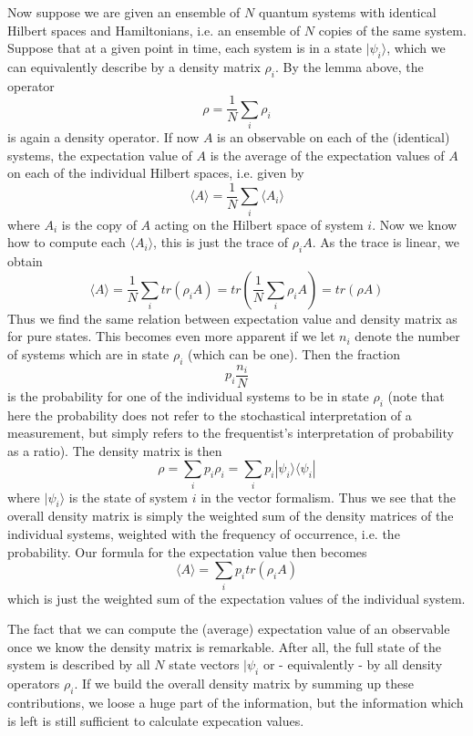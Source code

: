 \documentclass[a4paper, draft]{article}
\theoremstyle{own}
\theoremstyle{remark}
\begin{document}
Now suppose we are given an ensemble of $N$ quantum systems with identical Hilbert spaces and Hamiltonians, i.e. an ensemble of $N$ copies of the same system. Suppose that at a given point in time, each system is in a state $|\psi_i \rangle$, which we can equivalently describe by a density matrix $\rho_i$. By the lemma above, the operator
$$
\rho = \frac{1}{N} \sum_i \rho_i
$$
is again a density operator. If now $A$ is an observable on each of the (identical) systems, the expectation value of $A$ is the average of the expectation values of $A$ on each of the individual Hilbert spaces, i.e. given by
$$
\langle A \rangle = \frac{1}{N} \sum_i \langle A_i \rangle
$$
where $A_i$ is the copy of $A$ acting on the Hilbert space of system $i$. Now we know how to compute each $\langle A_i \rangle$, this is just the trace of $\rho_i A$. As the trace is linear, we obtain
$$
\langle A \rangle = \frac{1}{N}\sum_i tr(\rho_i A) = tr(\frac{1}{N}\sum_i \rho_i A) = tr(\rho A)
$$
Thus we find the same relation between expectation value and density matrix as for pure states. This becomes even more apparent if we let $n_i$ denote the number of systems which are in state $\rho_i$ (which can be one). Then the fraction 
$$
p_i \frac{n_i}{N}
$$ 
is the probability for one of the individual systems to be in state $\rho_i$ (note that here the probability does not refer to the stochastical interpretation of a measurement, but simply refers to the frequentist's interpretation of probability as a ratio). The density matrix is then
$$
\rho = \sum_i p_i \rho_i = \sum_i p_i |\psi_i \rangle \langle \psi_i |
$$
where $|\psi_i \rangle$ is the state of system $i$ in the vector formalism. Thus we see that the overall density matrix is simply the weighted sum of the density matrices of the individual systems, weighted with the frequency of occurrence, i.e. the probability. Our formula for the expectation value then becomes
$$
\langle A \rangle = \sum_i p_i tr(\rho_i A)
$$ 
which is just the weighted sum of the expectation values of the individual system.

The fact that we can compute the (average) expectation value of an observable once we know the density matrix is remarkable. After all, the full state of the system is described by all $N$ state vectors $|\psi_i$ or - equivalently - by all density operators $\rho_i$. If we build the overall density matrix by summing up these contributions, we loose a huge part of the information, but the information which is left is still sufficient to calculate expecation values.
\end{document}

